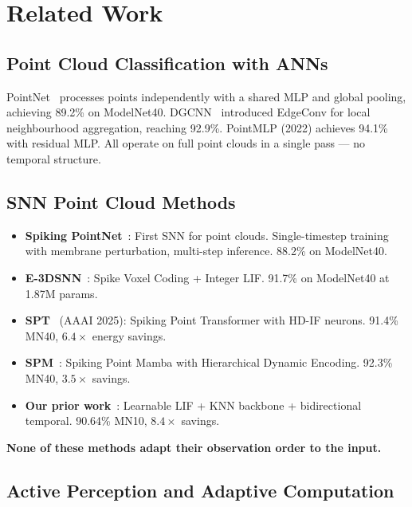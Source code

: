 \documentclass[11pt,a4paper]{article}
\begin{document}
\section{Related Work}

\subsection{Point Cloud Classification with ANNs}

PointNet~\cite{qi2017} processes points independently with a shared MLP and
global pooling, achieving 89.2\% on ModelNet40. DGCNN~\cite{dgcnn} introduced
EdgeConv for local neighbourhood aggregation, reaching 92.9\%. PointMLP (2022)
achieves 94.1\% with residual MLP. All operate on full point clouds in a single
pass --- no temporal structure.

\subsection{SNN Point Cloud Methods}

\begin{itemize}
  \item \textbf{Spiking PointNet}~\cite{spiking_ptnet}: First SNN for point
    clouds. Single-timestep training with membrane perturbation, multi-step
    inference. 88.2\% on ModelNet40.
  \item \textbf{E-3DSNN}~\cite{e3dsnn}: Spike Voxel Coding + Integer LIF.
    91.7\% on ModelNet40 at 1.87M params.
  \item \textbf{SPT}~\cite{spt} (AAAI 2025): Spiking Point Transformer with
    HD-IF neurons. 91.4\% MN40, $6.4\times$ energy savings.
  \item \textbf{SPM}~\cite{spm2025}: Spiking Point Mamba with Hierarchical
    Dynamic Encoding. 92.3\% MN40, $3.5\times$ savings.
  \item \textbf{Our prior work}~\cite{purdue2026}: Learnable LIF + KNN backbone
    + bidirectional temporal. 90.64\% MN10, $8.4\times$ savings.
\end{itemize}

\textbf{None of these methods adapt their observation order to the input.}

\subsection{Active Perception and Adaptive Computation}
\end{document}
